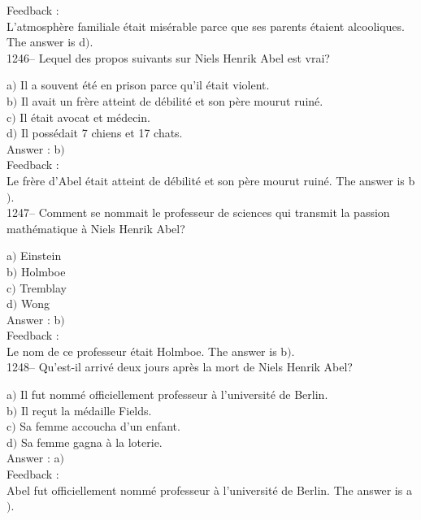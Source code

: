 ﻿\documentclass[letterpaper, 12pt]{article}
\begin{document}
Feedback : \\
L'atmosph\`ere familiale \'etait mis\'erable parce que ses parents
\'etaient alcooliques.
The answer is d$)$.\\

1246-- Lequel des propos suivants sur Niels Henrik Abel est vrai?

a$)$ Il a souvent \'et\'e en prison parce qu'il \'etait violent. \\
b$)$ Il avait un fr\`ere atteint de d\'ebilit\'e et son p\`ere mourut
ruin\'e. \\
c$)$ Il \'etait avocat et m\'edecin. \\
d$)$ Il poss\'edait 7 chiens et 17 chats.  \\

Answer : b$)$\\

Feedback : \\
Le fr\`ere d'Abel \'etait atteint de d\'ebilit\'e et son p\`ere
mourut ruin\'e.
The answer is b$)$.\\

1247-- Comment se nommait le professeur de sciences qui transmit la
passion math\'ematique \`a Niels Henrik Abel?

a$)$ Einstein \\
b$)$ Holmboe \\
c$)$ Tremblay \\
d$)$ Wong\\

Answer : b$)$\\

Feedback : \\
Le nom de ce professeur \'etait Holmboe.
The answer is b$)$.\\

1248-- Qu'est-il arriv\'e deux jours apr\`es la mort de Niels Henrik
Abel?

a$)$ Il fut nomm\'e officiellement professeur \`a l'universit\'e de Berlin.
\\
b$)$ Il re\c cut la m\'edaille Fields. \\
c$)$ Sa femme accoucha d'un enfant. \\
d$)$ Sa femme gagna \`a la loterie.\\

Answer : a$)$\\

Feedback : \\
Abel fut officiellement nomm\'e professeur \`a l'universit\'e de
Berlin.
The answer is a$)$.\\
\end{document}
